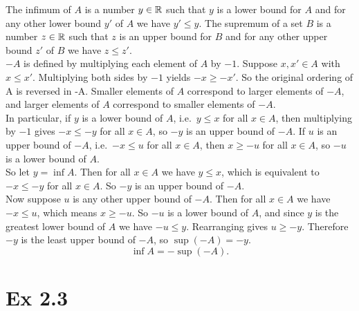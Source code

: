 \documentclass{report}
\begin{document}
\begin{proofWithHibiscus}
  The infimum of $A$ is a number $y \in \mathbb{R}$ such that $y$ is a lower bound for $A$ and for any other lower bound $y'$ of $A$ we have $y' \leq y$. The supremum of a set $B$ is a number $z \in \mathbb{R}$ such that $z$ is an upper bound for $B$ and for any other upper bound $z'$ of $B$ we have $z \leq z'$.  \\

  $-A$ is defined by multiplying each element of $A$ by $-1$. Suppose $x, x' \in A$ with $x \leq x'$. Multiplying both sides by $-1$ yields $-x \geq -x'$. So the original ordering of A is reversed in -A. Smaller elements of $A$ correspond to larger elements of $-A$, and larger elements of $A$ correspond to smaller elements of $-A$. \\

  In particular, if $y$ is a lower bound of $A$, i.e.\ $y \leq x$ for all $x \in A$, then multiplying by $-1$ gives $-x \leq -y$ for all $x \in A$, so $-y$ is an upper bound of $-A$. If $u$ is an upper bound of $-A$, i.e.\ $-x \leq u$ for all $x \in A$, then $x \geq -u$ for all $x \in A$, so $-u$ is a lower bound of $A$. \\

  So let $y = \inf A$. Then for all $x \in A$ we have $y \leq x$, which is equivalent to $-x \leq -y$ for all $x \in A$. So $-y$ is an upper bound of $-A$. \\

  Now suppose $u$ is any other upper bound of $-A$. Then for all $x \in A$ we have $-x \leq u$, which means $x \geq -u$. So $-u$ is a lower bound of $A$, and since $y$ is the greatest lower bound of $A$ we have $-u \leq y$. Rearranging gives $u \geq -y$. Therefore $-y$ is the least upper bound of $-A$, so $\sup(-A) = -y$. \\
  \[
  \inf A = -\sup(-A).
  \]
\end{proofWithHibiscus}

  

\section*{Ex 2.3}

\end{document}
